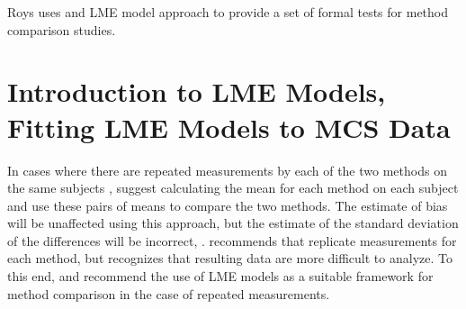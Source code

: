 \documentclass[12pt, a4paper]{report}
\theoremstyle{plain}
\theoremstyle{definition}
\theoremstyle{remark}
\begin{document}








Roys uses and LME model approach to provide a set of formal tests for method comparison studies.


\section{Introduction to LME Models, Fitting LME Models to MCS Data}

In cases where there are repeated measurements by each of the two methods on the same subjects , \citet{BA99} suggest calculating
the mean for each method on each subject and use these pairs of means to compare the two methods. The estimate of bias will be unaffected using this approach, but the estimate of the standard deviation of the differences will be incorrect, \citep{BXC2004}. \citet{BXC2004} recommends that replicate measurements for each method, but recognizes that resulting data are more difficult to analyze. To this end, \citet{BXC2004} and \citet{BXC2008} recommend the use of LME models as a suitable framework for method comparison in the case of repeated measurements.
\end{document}
